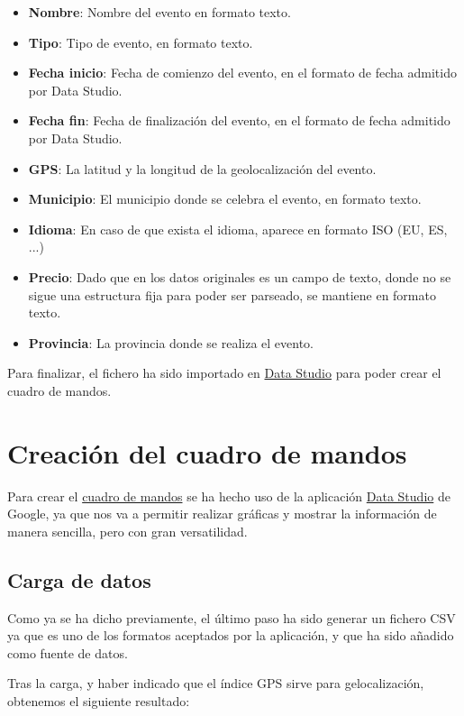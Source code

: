 \documentclass{\ClassPath/viu-tfm-template}
\begin{document}
\begin{itemize}
    \item \textbf{Nombre}: Nombre del evento en formato texto.
    \item \textbf{Tipo}: Tipo de evento, en formato texto.
    \item \textbf{Fecha inicio}: Fecha de comienzo del evento, en el formato de fecha admitido por Data Studio.
    \item \textbf{Fecha fin}: Fecha de finalización del evento, en el formato de fecha admitido por Data Studio.
    \item \textbf{GPS}: La latitud y la longitud de la geolocalización del evento.
    \item \textbf{Municipio}: El municipio donde se celebra el evento, en formato texto.
    \item \textbf{Idioma}: En caso de que exista el idioma, aparece en formato ISO (EU, ES, ...)
    \item \textbf{Precio}: Dado que en los datos originales es un campo de texto, donde no se sigue una estructura fija para poder ser parseado, se mantiene en formato texto.
    \item \textbf{Provincia}: La provincia donde se realiza el evento.
\end{itemize}


Para finalizar, el fichero ha sido importado en \href{https://datastudio.google.com/}{Data Studio} para poder crear el cuadro de mandos.

\chapter{Creación del cuadro de mandos}

Para crear el \href{https://datastudio.google.com/reporting/2322c44e-ad75-4243-a4a5-257be6d754bf/page/9AT6C}{cuadro de mandos} se ha hecho uso de la aplicación \href{https://datastudio.google.com/}{Data Studio} de Google, ya que nos va a permitir realizar gráficas y mostrar la información de manera sencilla, pero con gran versatilidad.

\section{Carga de datos}
Como ya se ha dicho previamente, el último paso ha sido generar un fichero CSV ya que es uno de los formatos aceptados por la aplicación, y que ha sido añadido como fuente de datos.

Tras la carga, y haber indicado que el índice GPS sirve para gelocalización, obtenemos el siguiente resultado:
\end{document}
